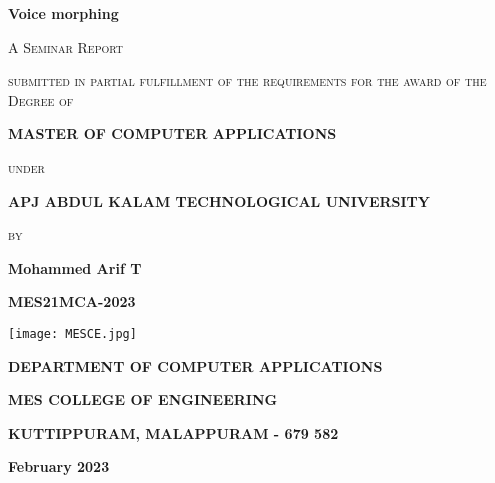 \documentclass[12pt]{report}
\begin{document}
\begin{titlepage}
	\centering
	
	{\LARGE\bfseries Voice morphing \par}
	\vspace{1cm}
	{\scshape\Large A Seminar Report\par}
	{\scshape\large submitted in partial fulfillment of the requirements
for the award of the Degree of \par}
	\vspace{1.25cm}
	{\large\bfseries MASTER OF COMPUTER APPLICATIONS\par}
	{\scshape\large under \par}
	{\large\bfseries APJ ABDUL KALAM TECHNOLOGICAL UNIVERSITY \par}
	\vspace{1.25cm}
	{\scshape\large by \par}
	{\Large\bfseries Mohammed Arif T \par}
	{\Large\bfseries MES21MCA-2023 \par}
	\vspace{1cm}
	
	\texttt{[image: MESCE.jpg]}\par\vspace{1cm}
	
	{\large\bfseries DEPARTMENT OF COMPUTER APPLICATIONS\par}
	{\large\bfseries MES COLLEGE OF ENGINEERING\par}
	{\small\bfseries KUTTIPPURAM, MALAPPURAM - 679 582\par}
	
	\vspace{0.4cm}
	
	{\large \bfseries February 2023 \par}
\end{titlepage}
\end{document}
